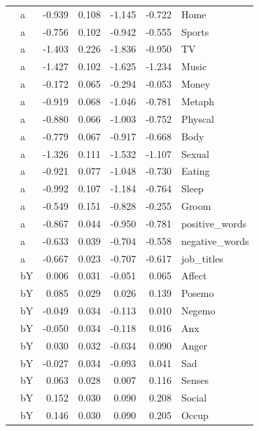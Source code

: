\documentclass[11pt,a4paper]{article}
\begin{document}
\begin{longtable}{llrrrrl}
   & a & -0.939 &  0.108 &   -1.145 &    -0.722 &            Home \\
   & a & -0.756 &  0.102 &   -0.942 &    -0.555 &          Sports \\
   & a & -1.403 &  0.226 &   -1.836 &    -0.950 &              TV \\
   & a & -1.427 &  0.102 &   -1.625 &    -1.234 &           Music \\
   & a & -0.172 &  0.065 &   -0.294 &    -0.053 &           Money \\
   & a & -0.919 &  0.068 &   -1.046 &    -0.781 &          Metaph \\
   & a & -0.880 &  0.066 &   -1.003 &    -0.752 &         Physcal \\
   & a & -0.779 &  0.067 &   -0.917 &    -0.668 &            Body \\
   & a & -1.326 &  0.111 &   -1.532 &    -1.107 &          Sexual \\
   & a & -0.921 &  0.077 &   -1.048 &    -0.730 &          Eating \\
   & a & -0.992 &  0.107 &   -1.184 &    -0.764 &           Sleep \\
   & a & -0.549 &  0.151 &   -0.828 &    -0.255 &           Groom \\
   & a & -0.867 &  0.044 &   -0.950 &    -0.781 &  positive\_words \\
   & a & -0.633 &  0.039 &   -0.704 &    -0.558 &  negative\_words \\
   & a & -0.667 &  0.023 &   -0.707 &    -0.617 &      job\_titles \\
   & bY &  0.006 &  0.031 &   -0.051 &     0.065 &          Affect \\
   & bY &  0.085 &  0.029 &    0.026 &     0.139 &          Posemo \\
   & bY & -0.049 &  0.034 &   -0.113 &     0.010 &          Negemo \\
   & bY & -0.050 &  0.034 &   -0.118 &     0.016 &             Anx \\
   & bY &  0.030 &  0.032 &   -0.034 &     0.090 &           Anger \\
   & bY & -0.027 &  0.034 &   -0.093 &     0.041 &             Sad \\
   & bY &  0.063 &  0.028 &    0.007 &     0.116 &          Senses \\
   & bY &  0.152 &  0.030 &    0.090 &     0.208 &          Social \\
   & bY &  0.146 &  0.030 &    0.090 &     0.205 &           Occup \\

\end{longtable}
\end{document}
